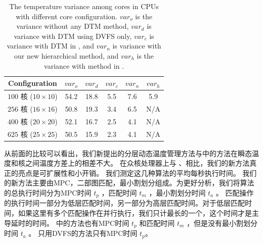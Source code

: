 \begin{table}
\centering
 \caption{The temperature variance among cores in CPUs with different core
   configuration. $var_o$ is the variance without
any DTM method,  
$var_d$ is variance with DTM using DVFS only, 
$var_c$ is variance with DTM in \cite{MaWang:APCCAS'14}, 
and $var_n$ is variance with our
new hierarchical method, and $var_h$ is the variance with method in \cite{Hanumaiah:TCAD'11}. \label{tab:var}}{
 \begin{tabular}{|c|c|c|c|c|c|}
 \hline
 \hline
 Configuration  & $var_o$ & $var_d$ & $var_c$ & $var_n$ & $var_h$ \\
 \hline 
 \hline
 $100$ 核 ($10 \times 10$) & 54.2 & 18.8 & 5.5 & 7.6 & 5.9\\

 \hline
 $256$ 核 ($16 \times 16$) & 50.8 & 19.3 & 3.4 & 6.5 & N/A\\
 \hline
 $400$ 核 ($20 \times 20$) & 52.1 & 16.7 & 2.5 & 4.1 & N/A\\
 \hline
 $625$ 核 ($25 \times 25$) & 50.5 & 15.9 & 2.3 & 4.1 & N/A\\
 \hline
 \hline
 \end{tabular}}
 \end{table}
 
 从前面的比较可以看出，我们新提出的分层动态温度管理方法与\cite{MaWang:APCCAS'14}中的方法在瞬态温度和核之间温度方差上的相差不大。
 在众核处理器上与 \cite{MaWang:APCCAS'14}、\cite{Hanumaiah:TCAD'11}相比，我们的新方法真正的亮点是可扩展性和小开销。
 我们测定这几种算法的平均每秒执行时间。
 我们的新方法主要由MPC，二部图匹配，最小割划分组成。为更好分析，我们将算法的总执行时间分为MPC时间 $t_p$ ，匹配时间 $t_m$ ，最小割划分时间 $t_a$ 。
 匹配操作的执行时间一部分为低层匹配时间，另一部分为高层匹配时间。对于低层匹配时间，如果这里有多个匹配操作在并行执行，我们只计最长的一个，这个时间才是主导延时的时间。
 \cite{MaWang:APCCAS'14}中的方法也有MPC时间 $t_p$ 和匹配时间 $t_m$ ，但是没有最小割划分时间 $t_a$ 。
 只用DVFS的方法只有MPC时间 $t_p$。
 
 
 
